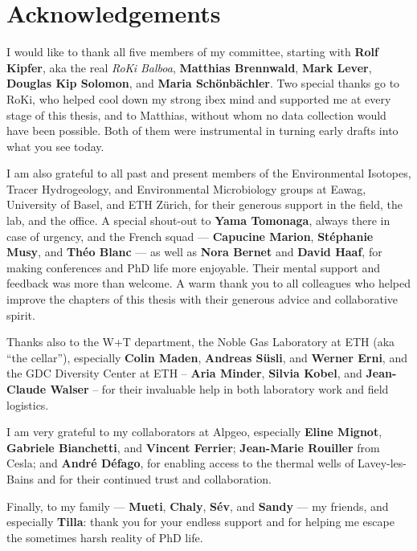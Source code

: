 
\bigskip

\begingroup
\let\clearpage\relax
\let\cleardoublepage\relax
\let\cleardoublepage\relax
\chapter*{Acknowledgements}

\def\thanks#1{%
\begingroup
\leftskip1em
\noindent #1
\par
\endgroup
}

I would like to thank all five members of my committee, starting with \textbf{Rolf Kipfer}, aka the real\textit{ RoKi Balboa}, \textbf{Matthias Brennwald}, \textbf{Mark Lever}, \textbf{Douglas Kip Solomon}, and \textbf{Maria Schönbächler}.
Two special thanks go to RoKi, who helped cool down my strong ibex mind and supported me at every stage of this thesis, and to Matthias, without whom no data collection would have been possible.
Both of them were instrumental in turning early drafts into what you see today.

I am also grateful to all past and present members of the Environmental Isotopes, Tracer Hydrogeology, and Environmental Microbiology groups at Eawag, University of Basel, and ETH Zürich, for their generous support in the field, the lab, and the office.
A special shout-out to \textbf{Yama Tomonaga}, always there in case of urgency, and the French squad --- \textbf{Capucine Marion}, \textbf{Stéphanie Musy}, and \textbf{Théo Blanc} --- as well as \textbf{Nora Bernet} and \textbf{David Haaf}, for making conferences and PhD life more enjoyable.
Their mental support and feedback was more than welcome.
A warm thank you to all colleagues who helped improve the chapters of this thesis with their generous advice and collaborative spirit. 

Thanks also to the W+T department, the Noble Gas Laboratory at ETH (aka “the cellar”), especially \textbf{Colin Maden}, \textbf{Andreas Süsli}, and \textbf{Werner Erni}, and the GDC Diversity Center at ETH -- \textbf{Aria Minder}, \textbf{Silvia Kobel}, and \textbf{Jean-Claude Walser} -- for their invaluable help in both laboratory work and field logistics.

I am very grateful to my collaborators at Alpgeo, especially \textbf{Eline Mignot}, \textbf{Gabriele Bianchetti}, and \textbf{Vincent Ferrier}; \textbf{Jean-Marie Rouiller} from Cesla; and \textbf{André Défago}, for enabling access to the thermal wells of Lavey-les-Bains and for their continued trust and collaboration.

Finally, to my family --- \textbf{Mueti}, \textbf{Chaly}, \textbf{Sév}, and \textbf{Sandy} --- my friends, and especially \textbf{Tilla}: thank you for your endless support and for helping me escape the sometimes harsh reality of PhD life.

\endgroup

